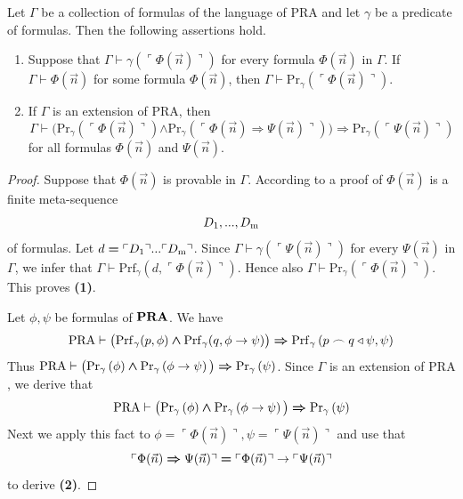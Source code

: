 \documentclass[10pt]{amsart}
\newcommand{\godel}[1]{\ulcorner #1 \urcorner}
\newcommand{\mra}{\boldsymbol{\Rightarrow}}
\newcommand{\mand}{\boldsymbol{\wedge}}
\newcommand{\meq}{\boldsymbol{=}}
\begin{document}
\begin{proposition}\label{proposition:first_two_hilbert_bernays_conditions}
	Let $\Gamma$ be a collection of formulas of the language of $\mathrm{PRA}$ and let $\gamma$ be a predicate of formulas. Then the following assertions hold.
	\begin{enumerate}[label=\emph{\textbf{(\arabic*)}}, leftmargin=3.0em]
    \item Suppose that $\Gamma \vdash \gamma\left(\godel{\Phi(\vec{n})}\right)$ for every formula $\Phi(\vec{n})$ in $\Gamma$. If $\Gamma\vdash \Phi(\vec{n})$ for some formula $\Phi(\vec{n})$, then $\Gamma \vdash \mathrm{Pr}_{\gamma}\left(\godel{\Phi(\vec{n})}\right)$.
    \item If $\Gamma$ is an extension of $\mathrm{PRA}$, then 
      $$\Gamma \vdash \big(\mathrm{Pr}_{\gamma}\left(\godel{\Phi(\vec{n})}\right) \mand \mathrm{Pr}_{\gamma}\left(\godel{\Phi(\vec{n}) \mra \Psi(\vec{n})}\right)\big)\mra \mathrm{Pr}_{\gamma}\left(\godel{\Psi(\vec{n})}\right)$$
      for all formulas $\Phi(\vec{n})$ and $\Psi(\vec{n})$.
  \end{enumerate}
\end{proposition}
\begin{proof}
	Suppose that $\Phi(\vec{n})$ is provable in $\Gamma$. According to \cite{Systems_of_first_order_logic} a proof of $\Phi(\vec{n})$ is a finite meta-sequence
	$$D_{\rm{1}},...,D_{\rm{m}}$$
  of formulas. Let $d \meq \godel{D_{\rm{1}}}...\godel{D_{\rm{m}}}$. Since $\Gamma \vdash \gamma\left(\godel{\Psi(\vec{n})}\right)$ for every $\Psi(\vec{n})$ in $\Gamma$, we infer that $\Gamma \vdash \mathrm{Prf}_{\gamma}\left(d,\godel{\Phi(\vec{n})}\right)$. Hence also $\Gamma \vdash \mathrm{Pr}_{\gamma}\left(\godel{\Phi(\vec{n})}\right)$. This proves \textbf{(1)}.

	Let $\phi,\psi$ be formulas of $\mathbf{PRA}$. We have
  $$\mathrm{PRA} \vdash \big(\mathrm{Prf}_{\gamma}(p,\phi) \mand \mathrm{Prf}_{\gamma}(q,\phi \ra \psi)\big) \mra \mathrm{Prf}_{\gamma}\left(p\frown q \triangleleft \psi, \psi\right)$$
  Thus $\mathrm{PRA} \vdash \big(\mathrm{Pr}_{\gamma}\left(\phi\right) \mand \mathrm{Pr}_{\gamma}\left(\phi \ra \psi\right)\big)\mra \mathrm{Pr}_{\gamma}\left(\psi\right)$. Since $\Gamma$ is an extension of $\mathrm{PRA}$, we derive that
  $$\mathrm{PRA} \vdash \big(\mathrm{Pr}_{\gamma}\left(\phi\right) \mand \mathrm{Pr}_{\gamma}\left(\phi \ra \psi\right)\big)\mra \mathrm{Pr}_{\gamma}\left(\psi\right)$$
  Next we apply this fact to $\phi \meq \godel{\Phi(\vec{n})},\psi \meq \godel{\Psi(\vec{n})}$ and use that
	$$\godel{\Phi(\vec{n}) \mra \Psi(\vec{n})} \meq \godel{\Phi(\vec{n})} \ra \godel{\Psi(\vec{n})}$$
	to derive \textbf{(2)}.
\end{proof}
\end{document}
